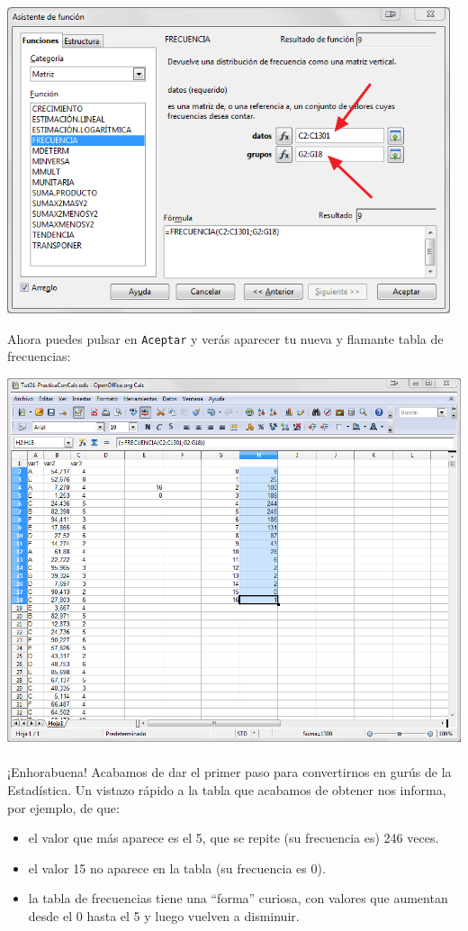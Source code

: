\documentclass[10pt,a4paper]{article}\usepackage[]{graphicx}\usepackage[]{color}
\begin{document}
    \begin{center}
    \includegraphics[height=9cm]{../fig/Tut01-Calc-tablaFrec-15.png}
    \end{center}
Ahora puedes pulsar en {\tt Aceptar} y verás aparecer tu nueva y flamante tabla de frecuencias:
    \begin{center}
    \includegraphics[width=16cm]{../fig/Tut01-Calc-tablaFrec-16.png}
    \end{center}
\paragraph*{}\label{tut01:lugar:TablaFrecuenciasVar3}¡Enhorabuena! Acabamos de dar el primer paso para convertirnos en gurús de la Estadística. Un vistazo rápido a la tabla que acabamos de obtener nos informa, por ejemplo, de que:
\begin{itemize}
  \item  el valor que más aparece es el 5, que se repite (su frecuencia es) 246 veces.
  \item  el valor 15 no aparece en la tabla (su frecuencia es 0).
  \item  la tabla de frecuencias tiene una ``forma'' curiosa, con valores que aumentan desde el 0 hasta el 5 y luego vuelven a disminuir.
\end{itemize}
\end{document}
